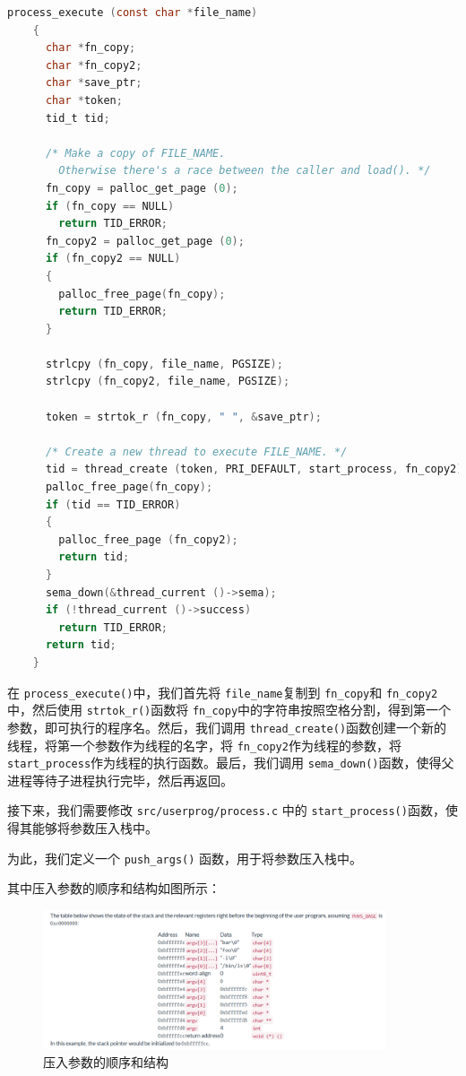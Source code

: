 \documentclass{article}
\begin{document}
\begin{lstlisting}[language=C, title=\texttt{src/userprog/process.c - process\_execute()}]
    process_execute (const char *file_name) 
    {
      char *fn_copy;
      char *fn_copy2;
      char *save_ptr;
      char *token;
      tid_t tid;
    
      /* Make a copy of FILE_NAME.
        Otherwise there's a race between the caller and load(). */
      fn_copy = palloc_get_page (0);
      if (fn_copy == NULL)
        return TID_ERROR;
      fn_copy2 = palloc_get_page (0);
      if (fn_copy2 == NULL)
      {
        palloc_free_page(fn_copy);
        return TID_ERROR;
      }
    
      strlcpy (fn_copy, file_name, PGSIZE);
      strlcpy (fn_copy2, file_name, PGSIZE);
    
      token = strtok_r (fn_copy, " ", &save_ptr);
    
      /* Create a new thread to execute FILE_NAME. */
      tid = thread_create (token, PRI_DEFAULT, start_process, fn_copy2);
      palloc_free_page(fn_copy);
      if (tid == TID_ERROR)
      {
        palloc_free_page (fn_copy2); 
        return tid;
      }
      sema_down(&thread_current ()->sema);
      if (!thread_current ()->success)
        return TID_ERROR;
      return tid;
    }
\end{lstlisting}

在 \texttt{process\_execute()}中，我们首先将 \texttt{file\_name}复制到 \texttt{fn\_copy}和 \texttt{fn\_copy2}中，然后使用 \texttt{strtok\_r()}函数将 \texttt{fn\_copy}中的字符串按照空格分割，得到第一个参数，即可执行的程序名。然后，我们调用 \texttt{thread\_create()}函数创建一个新的线程，将第一个参数作为线程的名字，将 \texttt{fn\_copy2}作为线程的参数，将 \texttt{start\_process}作为线程的执行函数。最后，我们调用 \texttt{sema\_down()}函数，使得父进程等待子进程执行完毕，然后再返回。

接下来，我们需要修改 \texttt{src/userprog/process.c} 中的 \texttt{start\_process()}函数，使得其能够将参数压入栈中。

为此，我们定义一个 \texttt{push\_args()} 函数，用于将参数压入栈中。

其中压入参数的顺序和结构如图所示：

\begin{figure}[H]
  \centering
  \includegraphics[width=0.9\textwidth]{img/1.png}
  \caption{压入参数的顺序和结构}
\end{figure}
\end{document}
